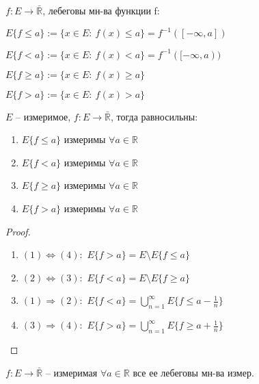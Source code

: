 \begin{definition}
    $f: E \rightarrow \bar{\mathbb{R}}$, лебеговы мн-ва функции f:

    $E \{ f \leq a \} := \{ x \in E: \ f(x) \leq a \} = f^{-1}([-\infty, a])$

    $E \{ f < a \} := \{ x \in E: \ f(x) < a \} = f^{-1}([-\infty, a))$

    $E \{ f \geq a \} := \{ x \in E: \ f(x) \geq a \}$

    $E \{ f > a \} := \{ x \in E: \ f(x) > a \}$
\end{definition}

\begin{theorem}
    $E$ -- измеримое, $f: E \rightarrow \bar{\mathbb{R}}$, тогда равносильны:

    \begin{enumerate}
        \item {
            $E \{ f \leq a \}$ измеримы $\forall a \in \mathbb{R}$
        }
        \item {
            $E \{ f < a \}$ измеримы $\forall a \in \mathbb{R}$
        }

        \item {
            $E \{ f \geq a \}$ измеримы $\forall a \in \mathbb{R}$
        }
        \item {
            $E \{ f > a \}$ измеримы $\forall a \in \mathbb{R}$
        }
    \end{enumerate}
\end{theorem}
\begin{proof}
    \begin{enumerate}
        \item {
            $(1) \Leftrightarrow (4): $ $E\{ f > a \} = E \setminus E\{ f \leq a \}$
        }
        \item {
            $(2) \Leftrightarrow (3): $ $ E\{ f < a \} = E \setminus E\{ f \geq a \} $
        }
        \item {
            $(1) \Rightarrow (2):$ $E\{ f < a \} = \bigcup_{n=1}^{\infty} E \{ f \leq a - \frac{1}{n} \}$
        }
        \item {
            $(3) \Rightarrow (4): $ $ E \{ f > a \} = \bigcup_{n=1}^{\infty} E \{ f \geq a + \frac{1}{n} \}$
        }
    \end{enumerate}
\end{proof}

\begin{definition}
    $f: E \rightarrow \bar{\mathbb{R}}$ -- измеримая $\forall a \in \mathbb{R}$ все ее лебеговы мн-ва измер.
\end{definition}

